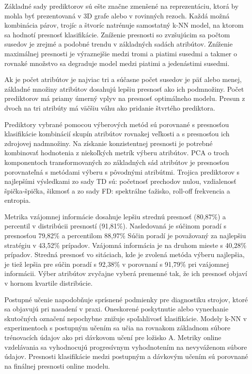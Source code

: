 Základné sady prediktorov sú ešte značne zmenšené na reprezentáciu, ktorá by mohla byť prezentovaná v 3D grafe alebo v rovinných rezoch. Každá možná kombinácia párov, trojíc a štvoríc natrénuje samostatný k-NN model, na ktorom sa hodnotí presnosť klasifikácie. Zníženie presnosti so zvzšujúcim sa počtom susedov je zrejmé a podobné trendu v základných sadách atribútov. Zníženie maximálnej presnosti je výraznejšie medzi tromi a piatimi susedmi a takmer o rovnaké množstvo sa degraduje model medzi piatimi a jedenástimi susedmi. 

Ak je počet atribútov je najviac tri a súčasne počet susedov je päť alebo menej, základné množiny atribútov dosahujú lepšiu presnosť ako ich podmnožiny.
Počet prediktorov má priamy úmerný vplyv na presnosť optimálneho modelu. Presun z dvoch na tri atribúty má väčšiu váhu ako pridanie štvrtého prediktora. 

Prediktory vybrané pomocou výberových metód sú porovnané s presnosťou klasifikácie kombinácií skupín atribútov rovnakej veľkosti a s presnosťou ich zdrojovej nadmnožiny. Na získanie konzistentnej presnosti je potrebné kombinovať hodnotenia z niekoľkých metrík výberu atribútov. PCA o troch komponentoch transformovaných zo základných sád atribútov je presnosťou porovnateľná s metódami výberu s pôvodnými atribútmi. Trojica prediktorov s najlepšími výsledkami zo sady TD sú: početnosť prechodov nulou, vzdialenosť špička-špička, šikmosť a zo sady FD: spektrálne ťažisko, roll-off frekvencia a entropia.

Metrika vzájomnej informácie dosahuje lepšiu strednú presnosť (80,87\%) a percentil v distribúcii presností (91,81\%). Nasledovaná je súčinom poradí s presnosťou 79,82\% a percentilom 88,97\% Súčin poradí je považovaný za najlepšiu stratégiu v 43,52\% prípadov. Vzájomná informácia je na druhom mieste s 40,28\% prípadov. Stredná presnosť vo sitáciach, kde je zvolená metóda výberu najlepšia, je tiež lepšia pre súčin poradí s 92,38\% v porovnaní s 91,79\% pri vzájomnej informácii. Výber atribútov zvyčajne vyberá premenné tak, že ich presnosť objaví v hornom kvartile distribúcie.

Postupné učenie napodobňuje sprísnené podmienky pre diagnostiku strojov, ktoré sa objavujú pri nasadení v praxi. Oneskorené poskytnutie alebo vynechanie skutočných označení nepochybne znižuje spoľahlivosť klasifikácie. Modely k-NN v experimentoch s postupným učením sa učia na rovnakom základnom súbore trénovacích údajov ako pri dávkovom učení pre ložisko A. Metriky online vzdelávania sa vyhodnocujú progresívnym vyhodnotením na nevyváženom súbore údajov. Presnosti klasifikácie medzi postupným a dávkovým učením sú porovnané na finálnej presnosti online modelu. 

